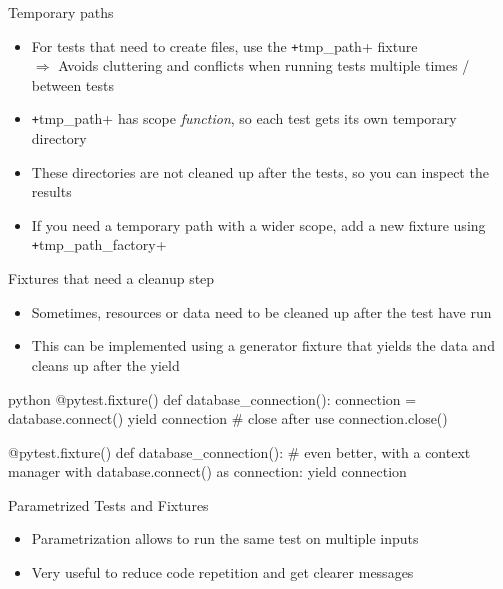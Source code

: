 \begin{frame}[c]{Temporary paths}
  \begin{itemize}
    \item For tests that need to create files, use the \texttt+tmp_path+ fixture \\
      $⇒$ Avoids cluttering and conflicts when running tests multiple times / between tests
    \item \texttt+tmp_path+ has scope \emph{function}, so each test gets its own temporary directory
    \item These directories are not cleaned up after the tests, so you can inspect the results
    \item If you need a temporary path with a wider scope, add a new fixture using \texttt+tmp_path_factory+
  \end{itemize}
\end{frame}


\begin{frame}[c, fragile]{Fixtures that need a cleanup step}
  \begin{itemize}
    \item Sometimes, resources or data need to be cleaned up after the test have run
    \item This can be implemented using a generator fixture that yields the data and cleans up after the yield
  \end{itemize}

  \begin{code}{python}
    @pytest.fixture()
    def database_connection():
        connection = database.connect()
        yield connection
        # close after use
        connection.close()

    @pytest.fixture()
    def database_connection():
        # even better, with a context manager
        with database.connect() as connection:
            yield connection
  \end{code}
\end{frame}

\begin{frame}[c]{Parametrized Tests and Fixtures}
  \begin{itemize}
    \item Parametrization allows to run the same test on multiple inputs
    \item Very useful to reduce code repetition and get clearer messages
  \end{itemize}

\end{frame}


